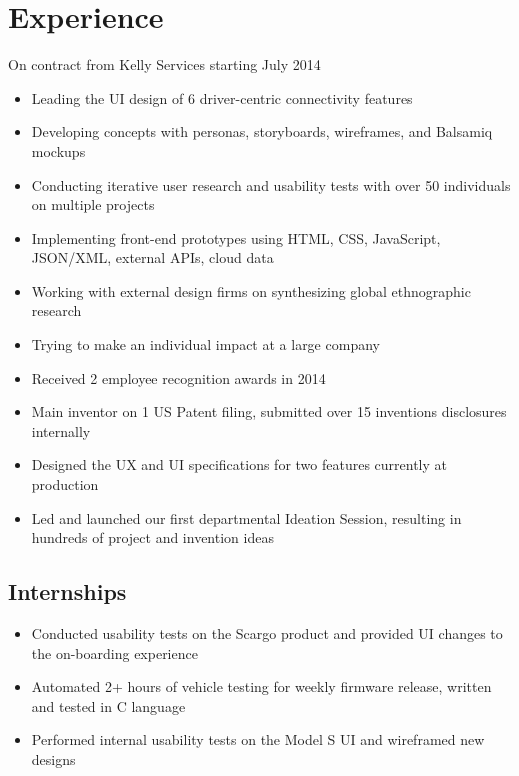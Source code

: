 \documentclass[10pt,a4paper,sans]{moderncv}        %
\begin{document}
\section{Experience}
\smallskip
{}
{On contract from Kelly Services starting July 2014}
{{}%
\smallskip
\begin{itemize} 
	
	\item Leading the UI design of 6 driver-centric connectivity features 
	\item Developing concepts with personas, storyboards, wireframes, and Balsamiq mockups 
	\item Conducting iterative user research and usability tests with over 50 individuals on multiple projects
	\item  Implementing front-end prototypes using HTML, CSS, JavaScript, JSON/XML, external APIs, cloud data
	\item Working with external design firms on synthesizing global ethnographic research
	\item Trying to make an individual impact at a large company
	\bigskip
	\item Received 2 employee recognition awards in 2014
	\item Main inventor on 1 US Patent filing, submitted over 15 inventions disclosures internally
	\item Designed the UX and UI specifications for two features currently at production
	\item Led and launched our first departmental Ideation Session, resulting in hundreds of project and invention ideas
	
\end{itemize}}

\bigskip
\subsection{Internships}
\bigskip
{}
{{}%
\begin{itemize} 
	\item  Conducted usability tests on the Scargo product and provided UI changes to the on-boarding experience
\end{itemize}}

{{}%
\begin{itemize} 
	\item  Automated 2+ hours of vehicle testing for weekly firmware release, written and tested in C language
	\item  Performed internal usability tests on the Model S UI and wireframed new designs
\end {itemize}}
\end{document}
